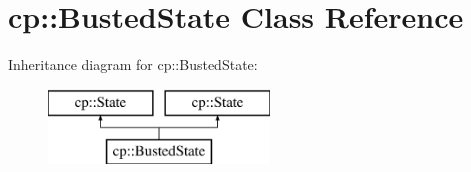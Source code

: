 \hypertarget{classcp_1_1_busted_state}{}\section{cp\+:\+:Busted\+State Class Reference}
\label{classcp_1_1_busted_state}
Inheritance diagram for cp\+:\+:Busted\+State\+:\begin{figure}[H]
\begin{center}
\leavevmode
\includegraphics[height=2.000000cm]{classcp_1_1_busted_state}
\end{center}
\end{figure}
